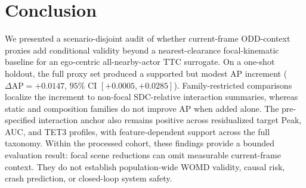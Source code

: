 \section{Conclusion}
\label{sec:conclusion}

We presented a scenario-disjoint audit of whether current-frame ODD-context proxies add conditional validity beyond a nearest-clearance focal-kinematic baseline for an ego-centric all-nearby-actor TTC surrogate. On a one-shot holdout, the full proxy set produced a supported but modest AP increment ($\Delta\text{AP} = +0.0147$, $95\%$ CI $[+0.0005, +0.0285]$). Family-restricted comparisons localize the increment to non-focal SDC-relative interaction summaries, whereas static and composition families do not improve AP when added alone. The pre-specified interaction anchor also remains positive across residualized target Peak, AUC, and TET3 profiles, with feature-dependent support across the full taxonomy. Within the processed cohort, these findings provide a bounded evaluation result: focal scene reductions can omit measurable current-frame context. They do not establish population-wide WOMD validity, causal risk, crash prediction, or closed-loop system safety.

